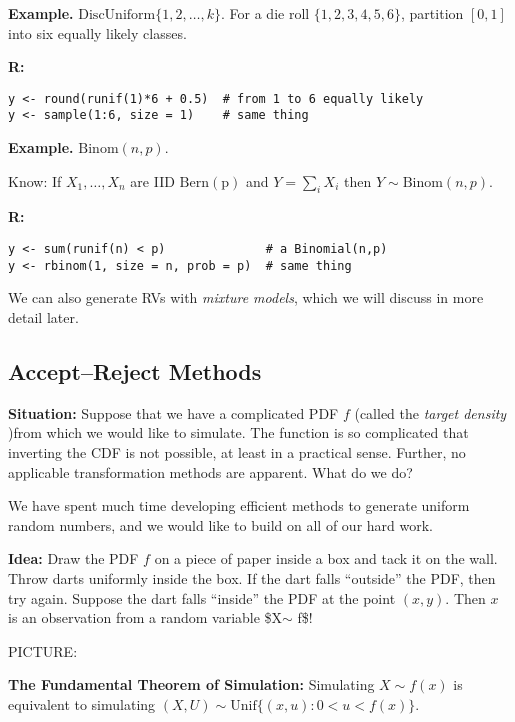 \documentclass[captions=tableheading]{scrbook}
\begin{document}
\begin{itemize}
\textbf{Example.} $\mathrm{DiscUniform}\{1,2,\ldots,k\}$.  For a die roll $\{1,2,3,4,5,6\}$, partition $[0,1]$ into six equally likely classes.

\textbf{R:}
\begin{verbatim}
y <- round(runif(1)*6 + 0.5)  # from 1 to 6 equally likely
y <- sample(1:6, size = 1)    # same thing
\end{verbatim}


\textbf{Example.} $\mathrm{Binom}(n,p)$.
 
Know: If $X_{1},\ldots,X_{n}$ are IID $\mathrm{Bern(p)}$ and $Y=\sum_{i}X_{i}$ then $Y\sim\mathrm{Binom}(n,p)$.

\textbf{R:}
\begin{verbatim}
y <- sum(runif(n) < p)              # a Binomial(n,p)
y <- rbinom(1, size = n, prob = p)  # same thing
\end{verbatim}

We can also generate RVs with \emph{mixture models}, which we will discuss in more detail later.

\end{itemize} %
\subsection{Accept--Reject Methods}
\label{sec-2_3_3}


\textbf{Situation:} Suppose that we have a complicated PDF $f$ (called the \emph{target density} )from which we would like to simulate. The function is so complicated that inverting the CDF is not possible, at least in a practical sense. Further, no applicable transformation methods are apparent. What do we do?

We have spent much time developing efficient methods to generate uniform random numbers, and we would like to build on all of our hard work.

\textbf{Idea:} Draw the PDF $f$ on a piece of paper inside a box and tack it on the wall. Throw darts uniformly inside the box. If the dart falls ``outside'' the PDF, then try again. Suppose the dart falls ``inside'' the PDF at the point $(x,y)$. Then $x$ is an observation from a random variable \$X$\sim$ f\$!

PICTURE:

\vspace{1.5in}  

\textbf{The Fundamental Theorem of Simulation:} Simulating $X\sim f(x)$ is equivalent to simulating $(X,U)\sim \mathrm{Unif}\{(x,u):0 < u < f(x)\}$.
\end{document}
